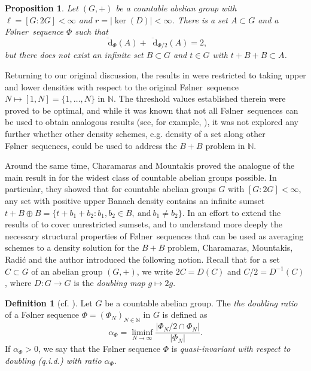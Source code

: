 \documentclass[reqno]{amsart}
\def\N{{\mathbb N}}
\newcommand*\diff{\mathop{}\!\mathrm{d}}
\newtheorem{proposition}[theorem]{Proposition}
\theoremstyle{definition}
\newtheorem{definition}[theorem]{Definition}
\theoremstyle{remark}
\theoremstyle{remark}
\def\N{{\mathbb N}}
\newcommand{\Folner}{F\o{}lner}
\begin{document}
\begin{proposition}\label{same subsequence intro}
Let $(G,+)$ be a countable abelian group with 
$\ell=[G:2G]<\infty$ and $r=|\ker(D)|<\infty$. There is a set 
$A\subset G$ and a \Folner\ sequence $\Phi$ such that 
$$\overline{\diff}_{\Phi}(A)+\overline{\diff}_{\Phi/2}(A)=2, $$
but there does not exist an infinite set $B\subset G$ and 
$t\in G$ with $t+B+B\subset A$.        
\end{proposition}

Returning to our original discussion, the results in \cite{kousek_radic2025BB} were restricted to 
taking upper and lower densities with respect to the original 
\Folner\ sequence $N\mapsto [1,N]=\{1,\ldots,N\}$ in $\N$.
The threshold values established therein were proved to be 
optimal, and while it was known that not all \Folner\ 
sequences can be used to obtain analogous results (see, for 
example, \cite[Example 3.6]{Kra_Moreira_Richter_Robertson_problems}), it was not explored
any further whether other density schemes, e.g. density of a set along other \Folner\ sequences, could be used to 
address the $B+B$ problem in $\N$. 

Around the same time, Charamaras and Mountakis 
\cite{Charamaras_Mountakis_2025} proved the analogue of the 
main result in \cite{Kra_Moreira_Richter_Robertson:2023} for 
the widest class of countable abelian groups possible. In 
particular, they showed that for countable abelian groups $G$
with $[G:2G]<\infty$, any set with positive upper Banach density contains an infinite sumset $t+B\oplus B=\{t+b_1+b_2:b_1,b_2\in B,\ \text{and}\ b_1\neq b_2\}$. 
In an effort to extend the results of 
\cite{Charamaras_Mountakis_2025} to cover unrestricted 
sumsets, and to understand more deeply the necessary 
structural properties of \Folner\ sequences that can be used 
as averaging schemes to a density solution for the $B+B$ 
problem, Charamaras, Mountakis, Radi{\'c} and the author 
\cite{charamaras_kousek_mountakis_radic2025BBingroups} 
introduced the following notion. Recall that for a set $C \subset G$ of an abelian group $(G,+)$, we write $2C = D(C)$ and $C/2 = D^{-1}(C)$, where $D\colon G \to G$ is the \emph{doubling map} $g \mapsto 2g$.

\begin{definition}[cf. {\cite[Definition 1.2]{charamaras_kousek_mountakis_radic2025BBingroups}}]\label{quasi-invariant to doubling def}
Let $G$ be a countable abelian group. The {\em the doubling ratio} of a \Folner{} sequence $\Phi=(\Phi_N)_{N\in\N}$ in $G$ is defined as
    \begin{equation} \label{eq alpha_Phi defn}
        \alpha_{\Phi}  = 
        \liminf_{N\to \infty} \frac{| \Phi_N/2 \cap \Phi_N|}{|\Phi_N|}.
    \end{equation}
    If $\alpha_\Phi>0$, we say that the \Folner{} sequence $\Phi$ is 
    {\em quasi-invariant with respect to doubling (q.i.d.) with ratio $\alpha_\Phi$}.
\end{definition}
\end{document}
